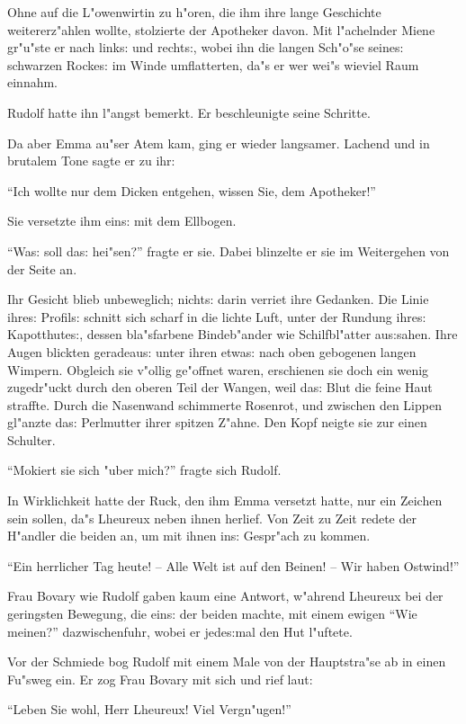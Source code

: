 \documentclass[oneside,12pt]{book}
\newcommand{\s}{s:}%
\begin{document}
Ohne auf die L"owenwirtin zu h"oren, die ihm ihre lange Geschichte
weitererz"ahlen wollte, stolzierte der Apotheker davon. Mit
l"achelnder Miene gr"u"ste er nach link{\s} und recht{\s}, wobei
ihn die langen Sch"o"se seine{\s} schwarzen Rocke{\s} im Winde
umflatterten, da"s er wer wei"s wieviel Raum einnahm.

Rudolf hatte ihn l"angst bemerkt. Er beschleunigte seine Schritte.

Da aber Emma au"ser Atem kam, ging er wieder langsamer. Lachend
und in brutalem Tone sagte er zu ihr:

"`Ich wollte nur dem Dicken entgehen, wissen Sie, dem Apotheker!"'

Sie versetzte ihm ein{\s} mit dem Ellbogen.

"`Wa{\s} soll da{\s} hei"sen?"' fragte er sie. Dabei blinzelte er
sie im Weitergehen von der Seite an.

Ihr Gesicht blieb unbeweglich; nicht{\s} darin verriet ihre
Gedanken. Die Linie ihre{\s} Profil{\s} schnitt sich scharf in die
lichte Luft, unter der Rundung ihre{\s} Kapotthute{\s}, dessen
bla"sfarbene Bindeb"ander wie Schilfbl"atter au{\s}sahen. Ihre
Augen blickten geradeau{\s} unter ihren etwa{\s} nach oben
gebogenen langen Wimpern. Obgleich sie v"ollig ge"offnet waren,
erschienen sie doch ein wenig zugedr"uckt durch den oberen Teil
der Wangen, weil da{\s} Blut die feine Haut straffte. Durch die
Nasenwand schimmerte Rosenrot, und zwischen den Lippen gl"anzte
da{\s} Perlmutter ihrer spitzen Z"ahne. Den Kopf neigte sie zur
einen Schulter.

"`Mokiert sie sich "uber mich?"' fragte sich Rudolf.

In Wirklichkeit hatte der Ruck, den ihm Emma versetzt hatte, nur
ein Zeichen sein sollen, da"s Lheureux neben ihnen herlief. Von
Zeit zu Zeit redete der H"andler die beiden an, um mit ihnen
in{\s} Gespr"ach zu kommen.

"`Ein herrlicher Tag heute! -- Alle Welt ist auf den Beinen! --
Wir haben Ostwind!"'

Frau Bovary wie Rudolf gaben kaum eine Antwort, w"ahrend Lheureux
bei der geringsten Bewegung, die ein{\s} der beiden machte, mit
einem ewigen "`Wie meinen?"' dazwischenfuhr, wobei er jede{\s}mal
den Hut l"uftete.

Vor der Schmiede bog Rudolf mit einem Male von der Hauptstra"se ab
in einen Fu"sweg ein. Er zog Frau Bovary mit sich und rief laut:

"`Leben Sie wohl, Herr Lheureux! Viel Vergn"ugen!"'
\end{document}

